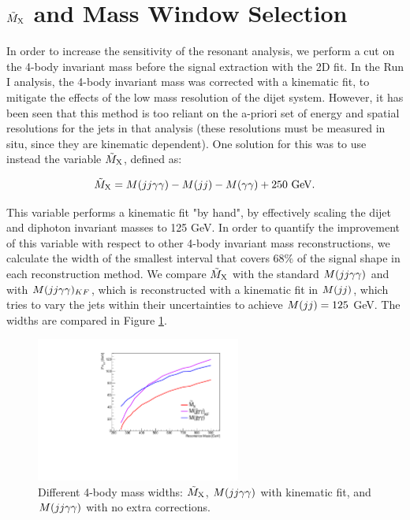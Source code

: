 \section{ $\tilde{M}_{\mathrm{X}}$ and Mass Window Selection}
\label{sec:masswindow}

In order to increase the sensitivity of the resonant analysis, we perform a cut on the 4-body invariant mass before the signal extraction with the 2D fit.
In the Run I analysis, the 4-body invariant mass was corrected with a kinematic fit, to mitigate the effects of the low mass resolution of the dijet system.
However, it has been seen that this method is too reliant on the a-priori set of energy and spatial resolutions for the jets in that analysis (these resolutions must be measured in situ, since they are kinematic dependent).
One solution for this was to use instead the variable $\tilde{M}_{\mathrm{X}}$, defined as:

\begin{equation}
\tilde{M}_{\mathrm{X}} = M(jj\gamma\gamma) - M(jj) - M(\gamma\gamma) + 250 \text{ GeV}.
\end{equation}

This variable performs a kinematic fit "by hand", by effectively scaling the dijet and diphoton invariant masses to 125 GeV. 
In order to quantify the improvement of this variable with respect to other 4-body invariant mass reconstructions, we calculate the width of the smallest interval that covers $68\%$ of the signal shape in each reconstruction method. 
We compare $\tilde{M}_{\mathrm{X}}$ with the standard $M(jj\gamma\gamma)$ and with $M(jj\gamma\gamma)_{KF}$, which is reconstructed with a kinematic fit in $M(jj)$, which tries to vary the jets within their uncertainties to achieve $M(jj) = 125$ GeV. 
The widths are compared in Figure \ref{fig:mxwidth}. 

\begin{figure}[h]
  \centering
  \includegraphics[width=0.6\textwidth]{figures/sec-window/width_67_prime.pdf}\hfil
  \caption{Different 4-body mass widths: $\tilde{M}_{\mathrm{X}}$, $M(jj\gamma\gamma)$ with kinematic fit, and $M(jj\gamma\gamma)$ with no extra corrections.}
  \label{fig:mxwidth}
\end{figure}

